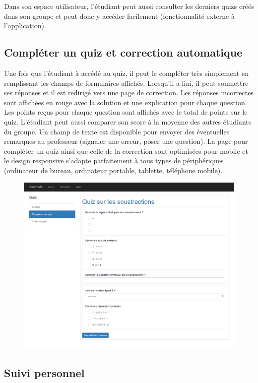 \documentclass[a4,10pt,french]{sphinxmanual}
\begin{document}
Dans son espace utilisateur, l'étudiant peut aussi consulter les derniers quizs créés dans son groupe et peut donc y accéder facilement (fonctionnalité externe à l'application).


\subsection{Compléter un quiz et correction automatique}
\label{doc-user:completer-un-quiz-et-correction-automatique}
Une fois que l'étudiant à accédé au quiz, il peut le compléter très simplement en remplissant les champs de formulaires affichés. Lorsqu'il a fini, il peut soumettre ses réponses et il est redirigé vers une page de correction. Les réponses incorrectes sont affichées en rouge avec la solution et une explication pour chaque question. Les points reçus pour chaque question sont affichés avec le total de points sur le quiz. L'étudiant peut aussi comparer son score à la moyenne des autres étudiants du groupe. Un champ de texte est disponible pour envoyer des éventuelles remarques au professeur (signaler une erreur, poser une question). La page pour compléter un quiz ainsi que celle de la correction sont optimisées pour mobile et le design responsive s'adapte parfaitement à tous types de périphériques (ordinateur de bureau, ordinateur portable, tablette, téléphone mobile).
\begin{figure}[htbp]
\centering

\includegraphics{complete.png}
\end{figure}


\subsection{Suivi personnel}
\label{doc-user:suivi-personnel}
\end{document}
